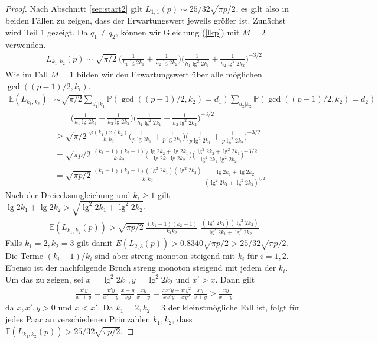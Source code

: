 \documentclass[a4paper, 10pt, ngerman]{article}
\newcommand{\E}{\mathbb{E}}
\renewcommand{\P}{\mathbb{P}}
\begin{document}
\begin{proof}
    Nach Abschnitt \ref{sec:start2} gilt $L_{1, 1}(p) \sim 25/32 \sqrt{\pi p /2}$, es gilt also in beiden Fällen zu zeigen, dass der Erwartungswert jeweils größer ist. Zunächst wird Teil 1 gezeigt. Da $q_1 \ne q_2$, können wir Gleichung (\ref{lkp}) mit $M = 2$ verwenden.
    \begin{align*}
        L_{k_1, k_2}(p) \sim \sqrt{\pi / 2} \ \Bigg (\frac 1 {h_1 \lg 2k_1} + \frac 1 {h_2 \lg 2k_2} \Bigg ) \Bigg ( \frac 1 {h_1 \lg^2 2k_1} + \frac 1 {h_2 \lg^2 2k_2} \Bigg )^{-3/2}
    \end{align*}
    Wie im Fall $M = 1$ bilden wir den Erwartungswert über alle möglichen $\gcd((p - 1)/2, k_i)$.
    \begin{align*}
        \E(L_{k_1, k_2})
         & \sim \sqrt{\pi / 2} \sum_{d_1 | k_1} \P(\gcd((p - 1)/2, k_2) = d_1) \sum_{d_2 | k_2} \P(\gcd((p - 1)/2, k_2) = d_2)                                                                                              \\
         & \qquad \Bigg (\frac 1 {h_1 \lg 2k_1} + \frac 1 {h_2 \lg 2k_2} \Bigg ) \Bigg ( \frac 1 {h_1 \lg^2 2k_1} + \frac 1 {h_2 \lg^2 2k_2} \Bigg )^{-3/2}                                                                 \\
         & \ge \sqrt{\pi / 2} \ \frac {\varphi(k_1) \varphi(k_2)} {k_1k_2} \Bigg (\frac 1 {p\lg 2k_1} + \frac 1 {p \lg 2k_2} \Bigg ) \Bigg ( \frac 1 {p \lg^2 2k_1} + \frac 1 {p \lg^2 2k_2} \Bigg )^{-3/2}                 \\
         & = \sqrt {\pi p / 2} \  \frac {(k_1 - 1)(k_2 - 1)} {k_1 k_2} \Bigg ( \frac {\lg 2k_2 + \lg 2k_1} {\lg 2k_1 \, \lg 2k_2} \Bigg ) \Bigg ( \frac {\lg^2 2k_2 + \lg^2 2k_1} {\lg^2 2k_1 \, \lg^2 2k_2} \Bigg )^{-3/2} \\
         & = \sqrt {\pi p / 2} \ \frac {(k_1 - 1)(k_2 - 1)(\lg^2 2k_1) (\lg^2 2k_2)} {k_1 k_2} \, \frac {\lg 2k_1 + \lg 2k_2} {(\lg^2 2k_1 + \lg^2 2k_2)^{3/2}}
    \end{align*}
    Nach der Dreiecksungleichung und $k_i \ge 1$ gilt $\lg 2k_1 + \lg 2k_2 > \sqrt{\lg^2 2k_1 + \lg^2 2k_2}$.
    \begin{align*}
        \E(L_{k_1, k_2}(p)) > \sqrt {\pi p / 2} \ \frac {(k_1 - 1)(k_2 - 1)} {k_1 k_2} \, \, \frac { (\lg^2 2k_1) (\lg^2 2k_2)} {\lg^2 2k_1 + \lg^2 2k_2}
    \end{align*}
    Falls $k_1 = 2, k_2 = 3$ gilt damit $E(L_{2, 3}(p)) > 0.8340 \sqrt{\pi p /2}  > 25 / 32 \sqrt{\pi p / 2}$. Die Terme $(k_i - 1)/k_i$ sind aber streng monoton steigend mit $k_i$ für $i = 1, 2$. Ebenso ist der nachfolgende Bruch streng monoton steigend mit jedem der $k_i$. Um das zu zeigen, sei $x = \lg^2 2k_1, y = \lg^2 2k_2$ und $x' > x$. Dann gilt
    \begin{align*}
        \frac {x'y} {x' + y}
        = \frac {x'y} {x' + y} \, \frac {x + y} {xy} \, \frac {xy} {x + y}
        = \frac {xx'y + x'y^2} {xx'y + xy^2} \, \frac {xy} {x + y} > \frac {xy} {x + y}
    \end{align*}
    da $x, x', y > 0$ und $x < x'$. Da $k_1 = 2, k_2 = 3$ der kleinstmögliche Fall ist, folgt für jedes Paar an verschiedenen Primzahlen $k_1, k_2$, dass $\E(L_{k_1, k_2}(p)) > 25 / 32 \sqrt{\pi p / 2}$.


\end{proof}
\end{document}
